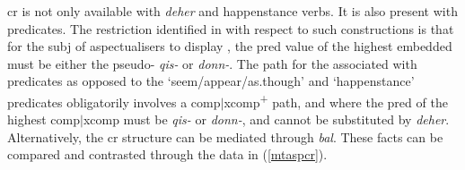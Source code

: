 \documentclass[output=paper]{LSP/langsci}
\begin{document}



{\sc cr} is not only available with \emph{deher} and happenstance verbs. It is also present with  predicates. The restriction identified in \citet{Camilleri16} with respect to such constructions is that for the {\sc subj} of aspectualisers to display , the {\sc pred} value of the highest embedded  must be either the pseudo- \emph{qis-} or \emph{donn-}. The path for the  associated with  predicates as opposed to the `seem/appear/as.though' and `happenstance' predicates obligatorily involves a {\sc comp}$|${\sc xcomp}\textsuperscript{+} path, and where the {\sc pred} of the highest {\sc comp}$|${\sc xcomp} must be \emph{qis-} or \emph{donn-}, and cannot be substituted by \emph{deher}. Alternatively, the {\sc cr} structure can be mediated through \emph{b\textcrh al}. These facts can be compared and contrasted through the data in (\ref{mtaspcr}). %
\end{document}
